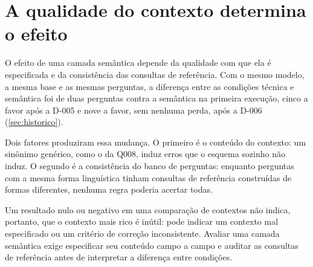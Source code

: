 \section{A qualidade do contexto determina o efeito}
\label{sec:design-importa}

O efeito de uma camada semântica depende da qualidade com que ela é
especificada e da consistência das consultas de referência. Com o mesmo
modelo, a mesma base e as mesmas perguntas, a diferença entre as condições
técnica e semântica foi de duas perguntas contra a semântica na primeira
execução, cinco a favor após a D-005 e nove a favor, sem nenhuma perda,
após a D-006 (\autoref{sec:historico}).

Dois fatores produziram essa mudança. O primeiro é o conteúdo do contexto:
um sinônimo genérico, como o da Q008, induz erros que o esquema sozinho
não induz. O segundo é a consistência do banco de perguntas: enquanto
perguntas com a mesma forma linguística tinham consultas de referência
construídas de formas diferentes, nenhuma regra poderia acertar todas.

Um resultado nulo ou negativo em uma comparação de contextos não indica,
portanto, que o contexto mais rico é inútil: pode indicar um contexto mal
especificado ou um critério de correção inconsistente. Avaliar uma camada
semântica exige especificar seu conteúdo campo a campo e auditar as
consultas de referência antes de interpretar a diferença entre condições.
